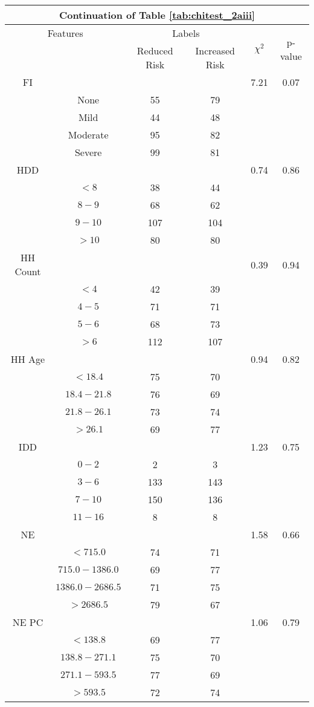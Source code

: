 \begin{table}
\centering
\label{tab:chitest_2aiii_cont}
\begin{tabular}{c c | c c| c | c}
\hline
\multicolumn{6}{c}{Continuation of Table \ref{tab:chitest_2aiii}}\\ 
\hline
\multicolumn{2}{c|}{Features}& \multicolumn{2}{c|}{Labels}& \multirow{2}{*}{$\chi^2$} & \multirow{2}{*}{p-value}\\ 
& & Reduced Risk & Increased Risk & & \\ 
\hline
FI &  &  & & 7.21 & 0.07 \\ 
& None & 55 & 79& & \\ 
& Mild & 44 & 48& & \\ 
& Moderate & 95 & 82& & \\ 
& Severe & 99 & 81& & \\ 
\hline 
HDD &  &  & & 0.74 & 0.86 \\ 
& $< 8$ & 38 & 44& & \\ 
& $8-9$ & 68 & 62& & \\ 
& $9-10$ & 107 & 104& & \\ 
& $> 10$ & 80 & 80& & \\ 
\hline 
HH Count &  &  & & 0.39 & 0.94 \\ 
& $< 4$ & 42 & 39& & \\ 
& $4-5$ & 71 & 71& & \\ 
& $5-6$ & 68 & 73& & \\ 
& $> 6$ & 112 & 107& & \\ 
\hline 
HH Age &  &  & & 0.94 & 0.82 \\ 
& $< 18.4$ & 75 & 70& & \\ 
& $18.4-21.8$ & 76 & 69& & \\ 
& $21.8-26.1$ & 73 & 74& & \\ 
& $> 26.1$ & 69 & 77& & \\ 
\hline 
IDD &  &  & & 1.23 & 0.75 \\ 
& $0-2$ & 2 & 3& & \\ 
& $3-6$ & 133 & 143& & \\ 
& $7-10$ & 150 & 136& & \\ 
& $11-16$ & 8 & 8& & \\ 
\hline 
NE &  &  & & 1.58 & 0.66 \\ 
& $< 715.0$ & 74 & 71& & \\ 
& $715.0-1386.0$ & 69 & 77& & \\ 
& $1386.0-2686.5$ & 71 & 75& & \\ 
& $> 2686.5$ & 79 & 67& & \\ 
\hline 
NE PC &  &  & & 1.06 & 0.79 \\ 
& $< 138.8$ & 69 & 77& & \\ 
& $138.8-271.1$ & 75 & 70& & \\ 
& $271.1-593.5$ & 77 & 69& & \\ 
& $> 593.5$ & 72 & 74& & \\ 
\hline 
\end{tabular}
\end{table}

